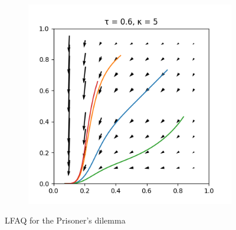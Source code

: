 \documentclass[10pt,a4paper]{article}
\begin{document}
\begin{figure}[h]
\begin{subfigure}[b]{0.30\textwidth}
    \end{subfigure}
    \begin{subfigure}[b]{0.30\textwidth}
        \includegraphics[width=\textwidth]{Figures/boltzmann_pd_5.png}
    \end{subfigure}
    \caption{LFAQ for the Prisoner's dilemma}
    \vspace*{-10mm}
    \label{fig:boltz_pd}
\end{figure}
\end{document}
